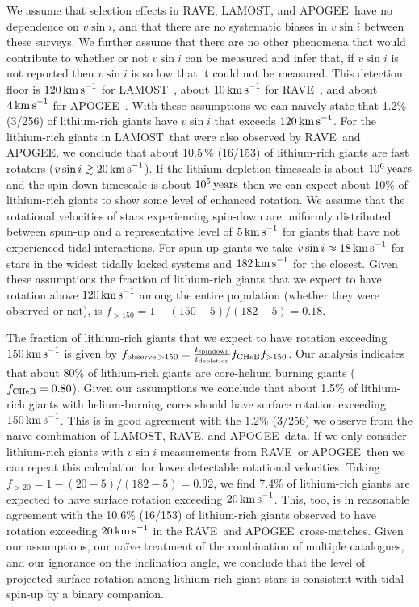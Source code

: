\documentclass[twocolumn]{aastex62}
\newcommand\lamost{LAMOST}
\newcommand\apogee{APOGEE}
\newcommand\rave{RAVE}
\begin{document}
We assume that selection effects in \rave, \lamost, and \apogee\ 
have no dependence on $v\sin{i}$, and that there are no systematic biases in $v\sin{i}$ between these surveys. We further assume that there are no other phenomena that would contribute to whether or not $v\sin{i}$ can be measured and infer that, if $v\sin{i}$ is not reported then $v\sin{i}$ is  so low that it could not be measured. This detection floor is $120\,{\rm km\,s}^{-1}$ for \lamost\ \citep{Frasca_2016}, about $10\,{\rm km\,s}^{-1}$ for \rave\ \citep{Siebert_2011}, 
and about $4\,{\rm km\,s}^{-1}$ for \apogee\ \citep{Deshpande_2013}.  With these assumptions we can na\"ively state that 1.2\% (3/256) of lithium-rich giants have $v\sin{i}$ that exceeds $120\,{\rm km\,s}^{-1}$. 
For the lithium-rich giants in \lamost\ that were also observed by \rave\ and \apogee,
we conclude that about 10.5\,\% (16/153) of lithium-rich giants are fast rotators ($v\sin{i} \gtrsim 20\,{\rm km\,s}^{-1}$). If the lithium depletion timescale is about $10^6\,{\rm years}$ and the spin-down timescale is about $10^5\,{\rm years}$ \citep{Tout_1992} then we can expect about 10\% of lithium-rich giants to show some level of enhanced rotation. We assume that the rotational velocities of stars experiencing spin-down are uniformly distributed between spun-up and  a representative level of $5\,{\rm km\,s}^{-1}$ for giants that have not experienced tidal interactions. 
For spun-up  giants we take $v\sin{i} \approx 18\,{\rm km\,s}^{-1}$ for stars in the widest tidally locked systems and $182\,{\rm km\,s}^{-1}$ for the closest. 
Given these assumptions the fraction of lithium-rich giants that we expect to have rotation above $120\,{\rm km\,s}^{-1}$  among the entire population (whether they were observed or not), is $f_{>150} = 1 - (150 - 5)/(182 - 5) = 0.18$. 


The fraction of lithium-rich giants that we expect to have rotation exceeding $150\,{\rm km\,s}^{-1}$ is given by $f_{{\rm observe}\,>150} = \frac{t_{\rm spindown}}{t_{\rm depletion}} f_{\rm CHeB} f_{>150}$. Our analysis indicates that about 80\% of lithium-rich giants are core-helium burning giants ($f_{\rm CHeB} = 0.80$). Given our assumptions we conclude that about 1.5\% of lithium-rich giants with helium-burning cores should have surface rotation exceeding $150\,{\rm km\,s}^{-1}$. This is in good agreement with the 1.2\% (3/256) we observe from the na\"ive combination of \lamost, \rave, and \apogee\ data. If we only consider lithium-rich giants with $v\sin{i}$ measurements from \rave\ or \apogee\ then we can repeat this calculation for lower detectable rotational velocities. Taking $f_{>20} = 1 - (20 - 5)/(182 - 5) = 0.92$, we find 7.4\% of lithium-rich giants are expected to have surface rotation exceeding $20\,{\rm km\,s}^{-1}$. This, too, is in reasonable agreement with the 10.6\% (16/153) of lithium-rich giants observed to have rotation exceeding $20\,{\rm km\,s}^{-1}$ in the \rave\ and \apogee\ cross-matches. Given our assumptions,  our na\"ive treatment of the combination of multiple catalogues, and our ignorance on the inclination angle, we conclude that the level of projected surface rotation among lithium-rich giant stars is consistent with tidal spin-up by a binary companion.
\end{document}
